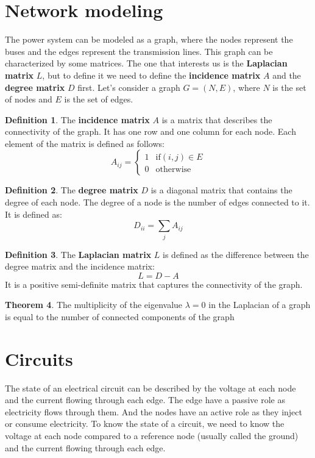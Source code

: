 \documentclass[12pt, openany]{report}
\theoremstyle{definition}
\newtheorem{thm}{Theorem}[chapter]
\newtheorem{definition}[thm]{Definition}
\begin{document}
\section{Network modeling}
The power system can be modeled as a graph, where the nodes represent the buses and the edges represent the transmission lines. This graph can be characterized by some matrices. The one that interests us is the \textbf{Laplacian matrix} $L$, but to define it we need to define the \textbf{incidence matrix} $A$ and the \textbf{degree matrix} $D$ first. Let's consider a graph $G=(N,E)$, where $N$ is the set of nodes and $E$ is the set of edges.
\begin{definition}
    The \textbf{incidence matrix} $A$ is a matrix that describes the connectivity of the graph. It has one row and one column for each node. Each element of the matrix is defined as follows:
    \begin{equation}
        A_{ij} = \begin{cases}
            1 & \text{if} (i,j) \in E \\
            0 & \text{otherwise}
        \end{cases}
    \end{equation}
\end{definition}
\begin{definition}
    The \textbf{degree matrix} $D$ is a diagonal matrix that contains the degree of each node. The degree of a node is the number of edges connected to it. It is defined as:
    \begin{equation}
        D_{ii} = \sum_{j} A_{ij}
    \end{equation}
\end{definition}
\begin{definition}
    The \textbf{Laplacian matrix} $L$ is defined as the difference between the degree matrix and the incidence matrix:
    \begin{equation}
        L = D - A
    \end{equation}
    It is a positive semi-definite matrix that captures the connectivity of the graph.
\end{definition}
\begin{thm}
    The multiplicity of the eigenvalue $\lambda = 0$ in the Laplacian of a graph is equal to the number of connected components of the graph
\end{thm}
\section{Circuits}
The state of an electrical circuit can be described by the voltage at each node and the current flowing through each edge. The edge have a passive role as electricity flows through them. And the nodes have an active role as they inject or consume electricity. To know the state of a circuit, we need to know the voltage at each node compared to a reference node (usually called the ground) and the current flowing through each edge. 
\end{document}
